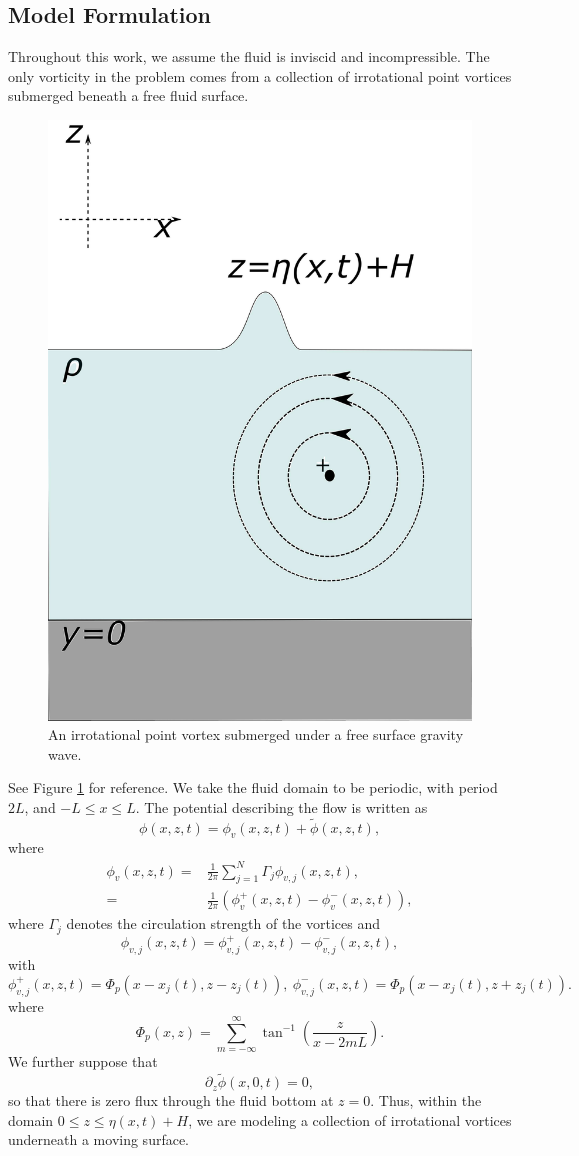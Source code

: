\documentclass[a4paper,11pt]{article}
\newcommand{\p}{\partial}
\begin{document}
\subsection*{Model Formulation}
Throughout this work, we assume the fluid is inviscid and incompressible.  The only vorticity in the problem comes from a collection of irrotational point vortices submerged beneath a free fluid surface.  
\begin{figure}
\centering
\includegraphics[width=.25\textwidth]{surface_vortex}
\caption{An irrotational point vortex submerged under a free surface gravity wave.}
\label{fig:vortex}
\end{figure}
See Figure \ref{fig:vortex} for reference.  We take the fluid domain to be periodic, with period $2L$, and $-L\leq x \leq L$.  The potential describing the flow is written as 
\[
\phi(x,z,t) = \phi_{v}(x,z,t) + \tilde{\phi}(x,z,t), 
\]
where
\begin{align*}
 \phi_{v}(x,z,t) = & \frac{1}{2\pi}\sum_{j=1}^{N}\Gamma_{j} \phi_{v,j}(x,z,t),\\
=& \frac{1}{2\pi}\left(\phi_{v}^{+}(x,z,t)-\phi_{v}^{-}(x,z,t)\right),
\end{align*}
where $\Gamma_{j}$ denotes the circulation strength of the vortices and
\[
\phi_{v,j}(x,z,t) = \phi_{v,j}^{+}(x,z,t) - \phi_{v,j}^{-}(x,z,t), 
\]
with
\[
\phi_{v,j}^{+}(x,z,t) = \Phi_{p}(x-x_{j}(t),z-z_{j}(t)), ~ \phi_{v,j}^{-}(x,z,t) = \Phi_{p}(x-x_{j}(t),z+z_{j}(t)).
\]
where
\[
\Phi_{p}(x,z) = \sum_{m=-\infty}^{\infty} \tan^{-1}\left(\frac{z}{x-2m L} \right).
\]
We further suppose that 
\[
\p_{z}\tilde{\phi}(x,0,t) = 0, 
\]
so that there is zero flux through the fluid bottom at $z=0$.  Thus, within the domain $0\leq z \leq \eta(x,t)+H$, we are modeling a collection of irrotational vortices underneath a moving surface. 
\end{document}
